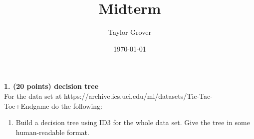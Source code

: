 \documentclass{article}
\title{Midterm}
\author{Taylor Grover}
\date\today
\newenvironment{problem}[2][]
    { \begin{mdframed}[backgroundcolor=gray!20] \textbf{#1#2} \\}
    {  \end{mdframed}}
\begin{document}
\maketitle %

\begin{problem}{1. (20 points) decision tree}
For the data set at 
https://archive.ics.uci.edu/ml/datasets/Tic-Tac-Toe+Endgame
do the following:
\begin{enumerate}[{(}a{)}]
  \item Build a decision tree using ID3 for the whole data set.
  Give the tree in some human-readable format.
\end{enumerate}
\end{problem}
\end{document}
